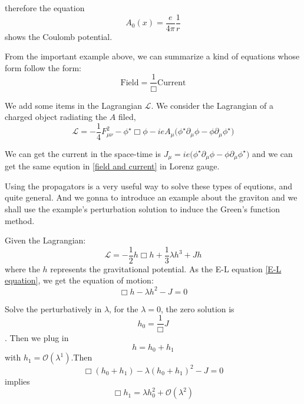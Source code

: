 \documentclass[12pt,openany]{book}
\begin{document}
	therefore the equation
	\begin{equation}
		A_0(x)=\frac{e}{4\pi}\frac{1}{r}
	\end{equation}
	shows the Coulomb potential.\par 
	From the important example above, we can summarize a kind of equations whose form follow the form:
	\begin{equation}\label{field and current}
		\text{Field}=\frac{1}{\Box}\text{Current}
	\end{equation}\par 
	We add some items in the Lagrangian $\mathcal{L}$. We consider the Lagrangian of a charged object radiating the $A$ filed,
	\begin{equation}
		\mathcal{L}=-\frac{1}{4}F^2_{\mu\nu}-\phi^\star\Box\phi-ieA_\mu\big(\phi^\star\partial_\mu\phi-\phi\partial_\mu\phi^\star\big)
	\end{equation}\par 
	We can get the current in the space-time is $J_\mu=ie\big(\phi^\star\partial_\mu\phi-\phi\partial_\mu\phi^\star\big)$ and we can get the same eqution in \eqref{field and current} in Lorenz gauge.\par 
	Using the propagators is a very useful way to solve these types of equtions, and quite general. And we gonna to introduce an example about the 
	graviton and we shall use the example's perturbation solution to induce the Green's function method.\par 
	Given the Lagrangian:
	\begin{equation}
		\mathcal{L}=-\frac{1}{2}h\Box h+\frac{1}{3}\lambda h^3+Jh
	\end{equation}
	where the $h$ represents the gravitational potential. As the E-L equation \eqref{E-L equation}, we get the 
	equation of motion:
	\begin{equation}
		\Box h-\lambda h^2-J=0
	\end{equation}\par 
	Solve the perturbatively in $\lambda$, for the $\lambda=0$, the zero solution is 
	\begin{equation}
		h_0=\frac{1}{\Box}J
	\end{equation}.
	Then we plug in
	\begin{equation}
		h=h_0+h_1
	\end{equation}
	with $h_1=\mathcal{O}(\lambda^1)$.Then
	\begin{equation}
		\Box(h_0+h_1)-\lambda(h_0+h_1)^2-J=0
	\end{equation}
	implies
	\begin{equation}
		\Box h_1=\lambda h_0^2+\mathcal{O}(\lambda^2)
	\end{equation}
\end{document}
